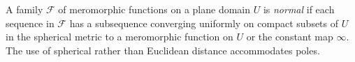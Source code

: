 
A family $\mathcal F$ of meromorphic functions on a plane domain $U$ is \emph{normal} if each sequence in $\mathcal F$ has a subsequence converging uniformly on compact subsets of $U$ in the spherical metric to a meromorphic function on $U$ or the constant map $\infty$. The use of spherical rather than Euclidean distance accommodates poles.
